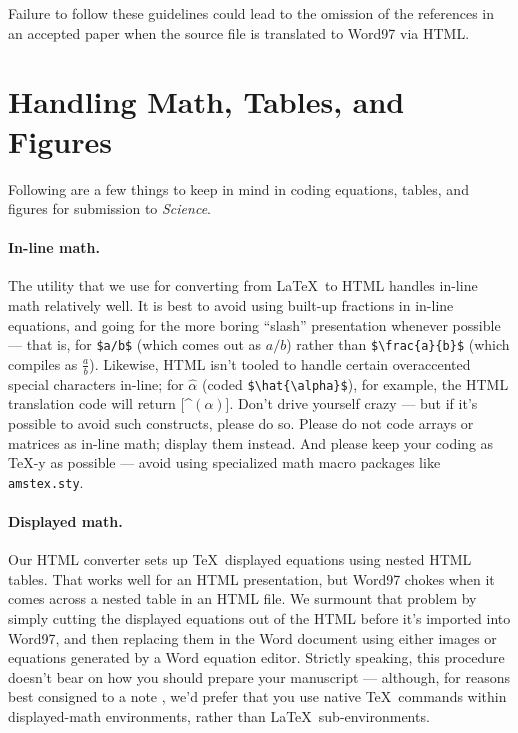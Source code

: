 \documentclass[12pt]{article}
\begin{document}
\noindent Failure to follow these guidelines could lead
to the omission of the references in an accepted paper when the source
file is translated to Word97 via HTML.

\section*{Handling Math, Tables, and Figures}

Following are a few things to keep in mind in coding equations,
tables, and figures for submission to {\it Science}.

\paragraph*{In-line math.}  The utility that we use for converting
from \LaTeX\ to HTML handles in-line math relatively well.  It is best
to avoid using built-up fractions in in-line equations, and going for
the more boring ``slash'' presentation whenever possible --- that is,
for \verb+$a/b$+ (which comes out as $a/b$) rather than
\verb+$\frac{a}{b}$+ (which compiles as $\frac{a}{b}$).  Likewise,
HTML isn't tooled to handle certain overaccented special characters
in-line; for $\hat{\alpha}$ (coded \verb+$\hat{\alpha}$+), for
example, the HTML translation code will return [\^{}$(\alpha)$].
Don't drive yourself crazy --- but if it's possible to avoid such
constructs, please do so.  Please do not code arrays or matrices as
in-line math; display them instead.  And please keep your coding as
\TeX-y as possible --- avoid using specialized math macro packages
like \texttt{amstex.sty}.

\paragraph*{Displayed math.} Our HTML converter sets up \TeX\
displayed equations using nested HTML tables.  That works well for an
HTML presentation, but Word97 chokes when it comes across a nested
table in an HTML file.  We surmount that problem by simply cutting the
displayed equations out of the HTML before it's imported into Word97,
and then replacing them in the Word document using either images or
equations generated by a Word equation editor.  Strictly speaking,
this procedure doesn't bear on how you should prepare your manuscript
--- although, for reasons best consigned to a note \cite{nattex}, we'd
prefer that you use native \TeX\ commands within displayed-math
environments, rather than \LaTeX\ sub-environments.
\end{document}
